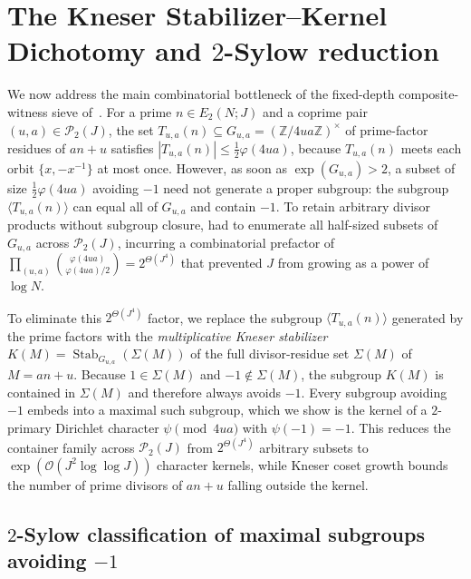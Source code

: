 \documentclass[11pt, a4paper]{article}
\theoremstyle{plain}
\theoremstyle{definition}
\newcommand{\Z}{\mathbb{Z}}
\begin{document}
\section{The Kneser Stabilizer--Kernel Dichotomy and $2$-Sylow reduction}\label{sec:stabilizer_kernel}

We now address the main combinatorial bottleneck of the fixed-depth composite-witness sieve of~\cite[\S4.1]{dahan2026a}. For a prime $n\in E_2(N;J)$ and a coprime pair $(u,a)\in\mathcal{P}_2(J)$, the set $T_{u,a}(n)\subseteq G_{u,a}=(\Z/4ua\Z)^{\times}$ of prime-factor residues of $an+u$ satisfies $|T_{u,a}(n)|\le\frac12\varphi(4ua)$, because $T_{u,a}(n)$ meets each orbit $\{x,-x^{-1}\}$ at most once. However, as soon as $\exp(G_{u,a})>2$, a subset of size $\frac12\varphi(4ua)$ avoiding $-1$ need not generate a proper subgroup: the subgroup $\langle T_{u,a}(n)\rangle$ can equal all of $G_{u,a}$ and contain $-1$. To retain arbitrary divisor products without subgroup closure, \cite{dahan2026a} had to enumerate all half-sized subsets of $G_{u,a}$ across $\mathcal{P}_2(J)$, incurring a combinatorial prefactor of $\prod_{(u,a)}\binom{\varphi(4ua)}{\varphi(4ua)/2}=2^{\Theta(J^{4})}$ that prevented $J$ from growing as a power of $\log N$.

To eliminate this $2^{\Theta(J^{4})}$ factor, we replace the subgroup $\langle T_{u,a}(n)\rangle$ generated by the prime factors with the \emph{multiplicative Kneser stabilizer} $K(M)=\operatorname{Stab}_{G_{u,a}}(\Sigma(M))$ of the full divisor-residue set $\Sigma(M)$ of $M=an+u$. Because $1\in\Sigma(M)$ and $-1\notin\Sigma(M)$, the subgroup $K(M)$ is contained in $\Sigma(M)$ and therefore always avoids $-1$. Every subgroup avoiding $-1$ embeds into a maximal such subgroup, which we show is the kernel of a $2$-primary Dirichlet character $\psi\pmod{4ua}$ with $\psi(-1)=-1$. This reduces the container family across $\mathcal{P}_2(J)$ from $2^{\Theta(J^{4})}$ arbitrary subsets to $\exp(\mathcal{O}(J^{2}\log\log J))$ character kernels, while Kneser coset growth bounds the number of prime divisors of $an+u$ falling outside the kernel.

\subsection{$2$-Sylow classification of maximal subgroups avoiding $-1$}\label{subsec:sylow_classification}
\end{document}
